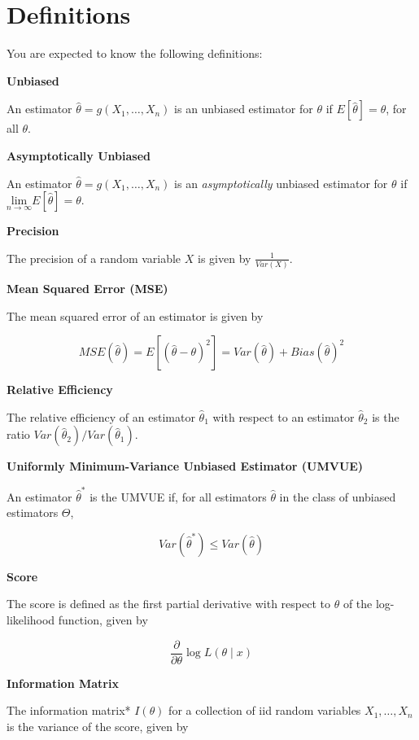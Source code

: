 \documentclass[
  letterpaper,
  DIV=11,
  numbers=noendperiod]{scrreprt}
\begin{document}
\hypertarget{definitions-3}{%
\section{Definitions}\label{definitions-3}}

You are expected to know the following definitions:

\textbf{Unbiased}

An estimator \(\hat{\theta} = g(X_1, \dots, X_n)\) is an unbiased
estimator for \(\theta\) if \(E[\hat{\theta}] = \theta\), for all
\(\theta\).

\textbf{Asymptotically Unbiased}

An estimator \(\hat{\theta} = g(X_1, \dots, X_n)\) is an
\emph{asymptotically} unbiased estimator for \(\theta\) if
\(\underset{n \to \infty}{\text{lim}} E[\hat{\theta}] = \theta\).

\textbf{Precision}

The precision of a random variable \(X\) is given by
\(\frac{1}{Var(X)}\).

\textbf{Mean Squared Error (MSE)}

The mean squared error of an estimator is given by

\[
MSE(\hat{\theta}) = E[(\hat{\theta} - \theta)^2] = Var(\hat{\theta}) + Bias(\hat{\theta})^2
\]

\textbf{Relative Efficiency}

The relative efficiency of an estimator \(\hat{\theta}_1\) with respect
to an estimator \(\hat{\theta}_2\) is the ratio
\(Var(\hat{\theta}_2)/Var(\hat{\theta}_1)\).

\textbf{Uniformly Minimum-Variance Unbiased Estimator (UMVUE)}

An estimator \(\hat{\theta}^*\) is the UMVUE if, for all estimators
\(\hat{\theta}\) in the class of unbiased estimators \(\Theta\),

\[
Var(\hat{\theta}^*) \leq Var(\hat{\theta})
\]

\textbf{Score}

The score is defined as the first partial derivative with respect to
\(\theta\) of the log-likelihood function, given by

\[
\frac{\partial}{\partial \theta} \log L(\theta \mid x)
\]

\textbf{Information Matrix}

The information matrix* \(I(\theta)\) for a collection of iid random
variables \(X_1, \dots, X_n\) is the variance of the score, given by
\end{document}
